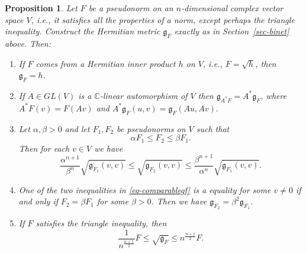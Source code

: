 \documentclass[a4paper,11pt,reqno]{amsart}
\theoremstyle{plain}
\newtheorem{proposition}[equation]{Proposition}
\theoremstyle{definition}
\theoremstyle{remark}
\theoremstyle{remark}
\numberwithin{equation}{section}
\newcommand{\cx}{{\mathbb C}}
\newcommand{\g}{\mathfrak{g}}
\newcommand{\red}[1]{{\color{red}{#1}}} %
\begin{document}
\begin{proposition} \label{Basic}
Let $F$ be a pseudonorm on an $n$-dimensional
complex vector space $V$, i.e., it satisfies all the properties of a norm, except perhaps the triangle inequality. 
Construct the Hermitian metric $\g_F$ exactly as in Section~\ref{sec-binet} above.
Then:
\begin{enumerate}[wide]
    \item If $ F $ comes from a Hermitian inner product $h$ on $V$, i.e., $ F = \sqrt{h} $, then  $\g_{F}=h.$
\item If $A\in GL(V)$ is a $\cx$-linear automorphism of 
$V$ then $\g_{A^*F}=A^*\g_F$, where $A^* F(v)=F(Av)$ and
$A^*\g_F(u,v)= \g_F(Au, Av).$ 
\item Let $\alpha, \beta >0$ and let $F_1, F_2$ be {pseudo}norms
on $V$ such that 
\begin{equation}
    \label{eq-comparablef1f2} \alpha F_1 \leq F_2 \leq \beta F_1.
\end{equation}
Then for each $v\in V$ we have
\begin{equation} \label{eq-comparablegf}
     \frac{\alpha^{n+1}}{\beta^{n}} \sqrt{\g_{F_1}(v,v)} \leq \sqrt{\g_{F_2}(v,v)}\leq  \frac{\beta^{n+1}}{\alpha^{n}}\sqrt{\g_{F_1}(v,v)}.
\end{equation}
\item One of the two inequalities in \eqref{eq-comparablegf} is a equality for some $v\not=0$
if and only if $F_2=\beta F_1$ for some $\beta>0$. Then we have  $\g_{F_2}= \beta^2 \g_{F_1}.$





\item If $ F $ satisfies the triangle inequality, then
\[\frac{1}{n^{\frac{n+1}{2}}} F \leq \sqrt{\g_F} \leq {n^{\frac{n+1}{2}}}{F}.  \]
\end{enumerate}
\end{proposition}
\end{document}
